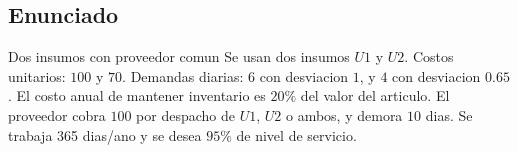 \subsection{Enunciado}

\begin{enunciado}{Dos insumos con proveedor comun}
Se usan dos insumos \(U1\) y \(U2\). Costos unitarios: \(100\) y \(70\). Demandas diarias: \(6\) con desviacion \(1\), y \(4\) con desviacion \(0.65\). El costo anual de mantener inventario es \(20\%\) del valor del articulo. El proveedor cobra \(100\) por despacho de \(U1\), \(U2\) o ambos, y demora \(10\) dias. Se trabaja 365 dias/ano y se desea \(95\%\) de nivel de servicio.
\end{enunciado}
